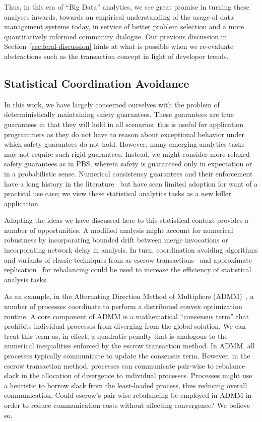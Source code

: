 Thus, in this era of ``Big Data'' analytics, we see great promise in
turning these analyses inwards, towards an empirical understanding of
the usage of data management systems today, in service of better
problem selection and a more quantitatively informed community
dialogue. Our previous discussion in
Section~\ref{sec:feral-discussion} hints at what is possible when we
re-evaluate abstractions such as the transaction concept in light of
developer trends.

\subsection{Statistical Coordination Avoidance}

In this work, we have largely concerned ourselves with the problem of
deterministically maintaining safety guarantees. These guarantees are
true guarantees in that they will hold in all scenarios: this is
useful for application programmers as they do not have to reason about
exceptional behavior under which safety guarantees do not
hold. However, many emerging analytics tasks may not require such
rigid guarantees. Instead, we might consider more relaxed safety
guarantees as in PBS, wherein safety is guaranteed only in expectation
or in a probabilistic sense. Numerical consistency guarantees and
their enforcement have a long history in the
literature~\cite{tact,frac,aqua,olston-thesis} but have seen limited
adoption for want of a practical use case; we view these statistical
analytics tasks as a new killer application.

Adapting the ideas we have discussed here to this statistical context
provides a number of opportunities. A modified \iconfluence analysis
might account for numerical robustness by incorporating bounded drift
between merge invocations or incorporating network delay in
analysis. In turn, coordination avoiding algorithms and variants of
classic techniques from as escrow transactions~\cite{escrow} and
approximate replication~\cite{olston-thesis} for rebalancing could be
used to increase the efficiency of statistical analysis tasks.

As an example, in the Alternating Direction Method of Multipliers
(ADMM)~\cite{boyd-admm}, a number of
processes coordinate to perform a distributed convex optimization
routine. A core component of ADMM is a mathematical ``consensus term''
that prohibits individual processes from diverging from the global
solution. We can treat this term as, in effect, a quadratic penalty
that is analogous to the numerical inequalities enforced by the escrow
transaction method. In ADMM, all processes typically communicate to
update the consensus term. However, in the escrow transaction method,
processes can communicate pair-wise to rebalance slack in the
allocation of divergence to individual processes. Processes might use
a heuristic to borrow slack from the least-loaded process, thus
reducing overall communication. Could escrow's pair-wise rebalancing
be employed in ADMM in order to reduce communication costs without
affecting convergence?  We believe so.

